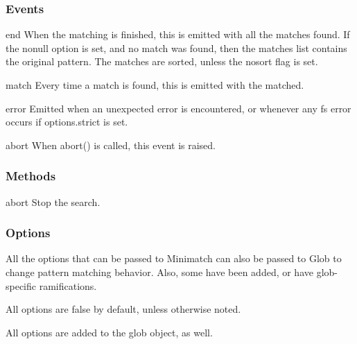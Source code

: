 \subsubsection*{Events}


\begin{DoxyItemize}
\item {\ttfamily end} When the matching is finished, this is emitted with all the matches found. If the {\ttfamily nonull} option is set, and no match was found, then the {\ttfamily matches} list contains the original pattern. The matches are sorted, unless the {\ttfamily nosort} flag is set.
\item {\ttfamily match} Every time a match is found, this is emitted with the matched.
\item {\ttfamily error} Emitted when an unexpected error is encountered, or whenever any fs error occurs if {\ttfamily options.\+strict} is set.
\item {\ttfamily abort} When {\ttfamily abort()} is called, this event is raised.
\end{DoxyItemize}

\subsubsection*{Methods}


\begin{DoxyItemize}
\item {\ttfamily abort} Stop the search.
\end{DoxyItemize}

\subsubsection*{Options}

All the options that can be passed to Minimatch can also be passed to Glob to change pattern matching behavior. Also, some have been added, or have glob-\/specific ramifications.

All options are false by default, unless otherwise noted.

All options are added to the glob object, as well.


